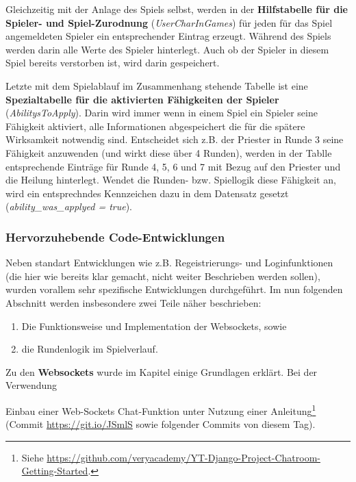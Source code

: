 Gleichzeitig mit der Anlage des Spiels selbst, werden in der \textbf{Hilfstabelle für die Spieler- und Spiel-Zurodnung} (\textit{UserCharInGames}) für jeden für das Spiel angemeldeten Spieler ein entsprechender Eintrag erzeugt. Während des Spiels werden darin alle Werte des Spieler hinterlegt. Auch ob der Spieler in diesem Spiel bereits verstorben ist, wird darin gespeichert. 

Letzte mit dem Spielablauf im Zusammenhang stehende Tabelle ist eine \textbf{Spezialtabelle für die aktivierten Fähigkeiten der Spieler} (\textit{AbilitysToApply}). Darin wird immer wenn in einem Spiel ein Spieler seine Fähigkeit aktiviert, alle Informationen abgespeichert die für die spätere Wirksamkeit notwendig sind. Entscheidet sich z.B. der Priester in Runde 3 seine Fähigkeit anzuwenden (und wirkt diese über 4 Runden), werden in der Tablle entsprechende Einträge für Runde 4, 5, 6 und 7 mit Bezug auf den Priester und die Heilung hinterlegt. Wendet die Runden- bzw. Spiellogik diese Fähigkeit an, wird ein entsprechndes Kennzeichen dazu in dem Datensatz gesetzt (\textit{ability\_was\_applyed = true}).





\subsubsection{Hervorzuhebende Code-Entwicklungen}


Neben standart Entwicklungen wie z.B. Regeistrierungs- und Loginfunktionen (die hier wie bereits klar gemacht, nicht weiter Beschrieben werden sollen), wurden vorallem sehr spezifische Entwicklungen durchgeführt. Im nun folgenden Abschnitt werden insbesondere zwei Teile näher beschrieben: 

\begin{enumerate}
    \item Die Funktionsweise und Implementation der Websockets, sowie 
    \item die Rundenlogik im Spielverlauf.
\end{enumerate}



Zu den \textbf{Websockets} wurde im Kapitel  einige Grundlagen erklärt. Bei der Verwendung


Einbau einer Web-Sockets Chat-Funktion unter Nutzung einer Anleitung\footnote{Siehe \url{https://github.com/veryacademy/YT-Django-Project-Chatroom-Getting-Started}. } (Commit \url{https://git.io/JSmlS} sowie folgender Commits von diesem Tag).



